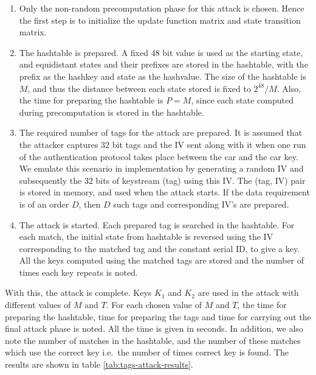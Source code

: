 \begin{enumerate}

\item Only the non-random precomputation phase for this attack is chosen. Hence the first step is to initialize the update function matrix and state transition matrix.
\item The hashtable is prepared. A fixed 48 bit value is used as the starting state, and equidistant states and their prefixes are stored in the hashtable, with the prefix as the hashkey and state as the hashvalue. The size of the hashtable is $M$, and thus the distance between each state stored is fixed to $2^{48}/M$. Also, the time for preparing the hashtable is $P = M$, since each state computed during precomputation is stored in the hashtable.  
\item The required number of tags for the attack are prepared. It is assumed that the attacker captures 32 bit tags and the IV sent along with it when one run of the authentication protocol takes place between the car and the car key. We emulate this scenario in implementation by generating a random IV and subsequently the 32 bits of keystream (tag) using this IV. The (tag, IV) pair is stored in memory, and used when the attack starts. If the data requirement is of an order $D$, then $D$ such tags and corresponding IV's are prepared. 
\item The attack is started. Each prepared tag is searched in the hashtable. For each match, the initial state from hashtable is reversed using the IV corresponding to the matched tag and the constant serial ID, to give a key. All the keys computed using the matched tags are stored and the number of times each key repeats is noted. 
\end{enumerate}

With this, the attack is complete. Keys $K_1$ and $K_2$ are used in the attack with different values of $M$ and $T$. For each chosen value of $M$ and $T$, the time for preparing the hashtable, time for preparing the tags and time for carrying out the final attack phase is noted. All the time is given in seconds. In addition, we also note the number of matches in the hashtable, and the number of these matches which use the correct key i.e.~the number of times correct key is found. The results are shown in table \ref{tab:tags-attack-results}.

